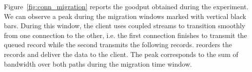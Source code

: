 
Figure~\ref{fig:conn_migration} reports the goodput obtained during the 
experiment. We can observe a peak during the migration windows marked with 
vertical black bars.%
During this window, the client uses coupled streams to transition smoothly from 
one \tcp connection to the other, i.e. the first \tcp connection finishes to 
transmit the queued \tcpls record while the second transmits the following 
records.
\tcpls reorders the records and deliver the data to the 
client. The peak corresponds to the sum of bandwidth over 
both paths during the migration time window.

